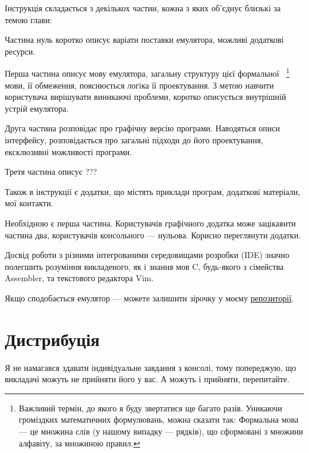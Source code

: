 \documentclass[oneside,final,14pt]{extreport}
\begin{document}
\bigskip

Інструкція складається з декількох частин, кожна з яких об'єднує близькі за темою глави:

Частина нуль коротко описує варіати поставки емулятора, можливі додаткові ресурси.

Перша частина описує мову емулятора, загальну структуру цієї 
формальної~
\footnote{Важливий термін, до якого я буду звертатися ще багато разів. Уникаючи громіздких математичних формулювань, можна сказати так: Формальна мова --- це множина слів (у нашому випадку --- рядків), що сформовані з множини алфавіту, за множиною правил.}
мови, її обмеження, пояснюється логіка її проектування. З метою навчити користувача вирішувати виникаючі проблеми, коротко описується внутрішній устрій емулятора.

Друга частина розповідає про графічну версію програми. Наводяться описи інтерфейсу, розповідається про загальні підходи до його проектування, ексклюзивні можливості програми. 

Третя частина описує ??? %

Також в інструкції є додатки, що містять приклади програм, додаткові матеріали, мої контакти.

\bigskip

\bigskip 

Необхідною є перша частина. Користувачів графічного додатка може зацікавити частина два, користувачів консольного --- нульова. Корисно переглянути додатки.

Досвід роботи з різними інтегрованими середовищами розробки (IDE) значно полегшить розуміння викладеного, як і знання мов C, будь-якого з сімейства Assembler, та текстового редактора Vim.

\bigskip

\bigskip

Якщо сподобається емулятор --- можете залишити зірочку у моєму  \href{https://github.com/Kaifolog/TME}{репозиторії}.

\setcounter{chapter}{-1}

\chapter{Дистрибуція}

Я не намагався здавати індивідуальне завдання з консолі, тому попереджую,
\marginpar[]{\Huge \bfseries !} 
 що викладачі можуть не прийняти його у вас. А можуть і прийняти, перепитайте.
 
\vspace{0.4 cm}
 
\end{document}
